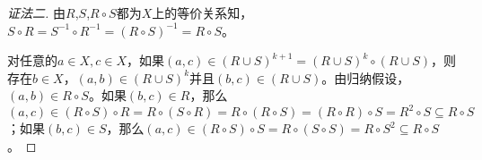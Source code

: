 \documentclass{article}
\begin{document}
\begin{CJK}{UTF8}{gbsn}
\begin{proof}[证法二]
        由$R$,$S$,$R\circ S$都为$X$上的等价关系知，$S\circ R=S^{-1}\circ R^{-1}=(R\circ S)^{-1}=R\circ S$。
      
        对任意的$a\in X,c\in X$，如果$(a,c)\in (R\cup S)^{k+1}=(R\cup S)^k\circ (R\cup S)$，则存在$b\in X$，$(a,b)\in (R\cup S)^k$并且$(b,c)\in (R\cup S)$。由归纳假设，$(a,b)\in R\circ S$。如果$(b,c)\in R$，那么$(a,c)\in (R\circ S)\circ R = R\circ (S\circ R) = R\circ (R\circ S) = (R\circ R)\circ S = R^2\circ S \subseteq R\circ S$；如果$(b,c)\in S$，那么$(a,c)\in (R\circ S)\circ S = R\circ (S\circ S) = R\circ S^2 \subseteq R\circ S$。
        
      
        
      \end{proof}
      

\end{CJK}
\end{document}
